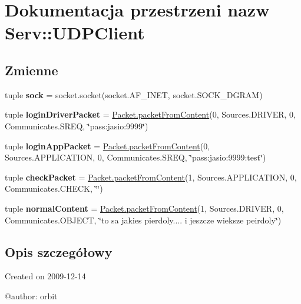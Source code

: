 \hypertarget{namespace_serv_1_1_u_d_p_client}{
\section{Dokumentacja przestrzeni nazw Serv::UDPClient}
\label{namespace_serv_1_1_u_d_p_client}
}
\subsection*{Zmienne}
\begin{DoxyCompactItemize}
\item 
\hypertarget{namespace_serv_1_1_u_d_p_client_a26010463e2557dd99ea69558ac84b513}{
tuple {\bfseries sock} = socket.socket(socket.AF\_\-INET, socket.SOCK\_\-DGRAM)}
\label{namespace_serv_1_1_u_d_p_client_a26010463e2557dd99ea69558ac84b513}

\item 
\hypertarget{namespace_serv_1_1_u_d_p_client_a6a7c093d00705f1a7a45121724849c7a}{
tuple {\bfseries loginDriverPacket} = \hyperlink{class_serv_1_1_packet_1_1_packet_a145ac89df7bc66728e8b3e642650aff4}{Packet.packetFromContent}(0, Sources.DRIVER, 0, Communicates.SREQ, \char`\"{}pass:jasio:9999\char`\"{})}
\label{namespace_serv_1_1_u_d_p_client_a6a7c093d00705f1a7a45121724849c7a}

\item 
\hypertarget{namespace_serv_1_1_u_d_p_client_a8224433da892f0816d12f588d2c55cb5}{
tuple {\bfseries loginAppPacket} = \hyperlink{class_serv_1_1_packet_1_1_packet_a145ac89df7bc66728e8b3e642650aff4}{Packet.packetFromContent}(0, Sources.APPLICATION, 0, Communicates.SREQ, \char`\"{}pass:jasio:9999:test\char`\"{})}
\label{namespace_serv_1_1_u_d_p_client_a8224433da892f0816d12f588d2c55cb5}

\item 
\hypertarget{namespace_serv_1_1_u_d_p_client_a5ca5a80c0fb3b47ffa84794ed8d3352e}{
tuple {\bfseries checkPacket} = \hyperlink{class_serv_1_1_packet_1_1_packet_a145ac89df7bc66728e8b3e642650aff4}{Packet.packetFromContent}(1, Sources.APPLICATION, 0, Communicates.CHECK, \char`\"{}\char`\"{})}
\label{namespace_serv_1_1_u_d_p_client_a5ca5a80c0fb3b47ffa84794ed8d3352e}

\item 
\hypertarget{namespace_serv_1_1_u_d_p_client_af4d57687ceee96cbdac42b143b2dd99f}{
tuple {\bfseries normalContent} = \hyperlink{class_serv_1_1_packet_1_1_packet_a145ac89df7bc66728e8b3e642650aff4}{Packet.packetFromContent}(1, Sources.DRIVER, 0, Communicates.OBJECT, \char`\"{}to sa jakies pierdoly.... i jeszcze wieksze peirdoly\char`\"{})}
\label{namespace_serv_1_1_u_d_p_client_af4d57687ceee96cbdac42b143b2dd99f}

\end{DoxyCompactItemize}


\subsection{Opis szczegółowy}
\begin{DoxyVerb}
Created on 2009-12-14

@author: orbit
\end{DoxyVerb}
 